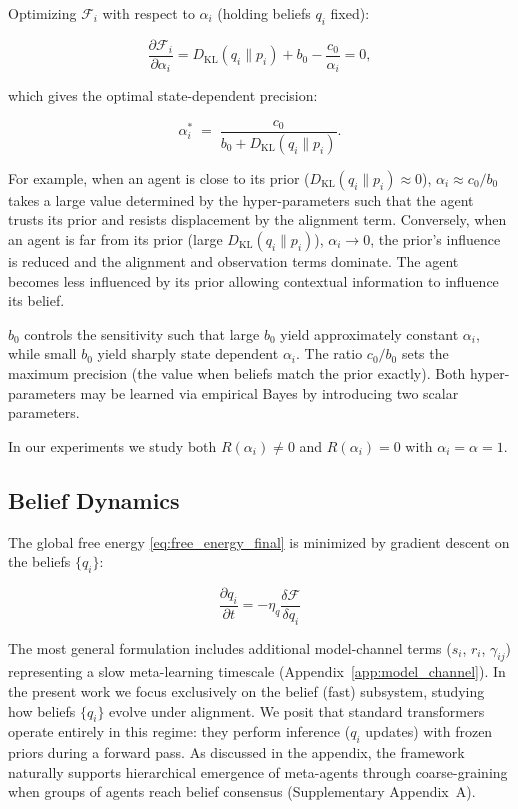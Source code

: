 \documentclass[twoside,11pt]{article}
\begin{document}
Optimizing $\mathcal{F}_i$ with respect to $\alpha_i$ (holding beliefs $q_i$ fixed):

\begin{equation}
\frac{\partial \mathcal{F}_i}{\partial \alpha_i}
= D_{\mathrm{KL}}(q_i \| p_i) + b_0 - \frac{c_0}{\alpha_i} = 0,
\end{equation}

which gives the optimal state-dependent precision:

\begin{equation}
\boxed{
\alpha_i^*
\;=\; \frac{c_0}{b_0 + D_{\mathrm{KL}}(q_i \| p_i)}.
}
\label{eq:state_dependent_alpha}
\end{equation}

For example, when an agent is close to its prior ($D_{\mathrm{KL}}(q_i \| p_i) \approx 0$), $\alpha_i \approx c_0/b_0$ takes a large value determined by the hyper-parameters such that the agent trusts its prior and resists displacement by the alignment term. Conversely, when an agent is far from its prior (large $D_{\mathrm{KL}}(q_i \| p_i)$), $\alpha_i \to 0$,  the prior's influence is reduced and the alignment and observation terms dominate. The agent becomes less influenced by its prior allowing contextual information to influence its belief.

$b_0$ controls the sensitivity such that large $b_0$ yield approximately constant $\alpha_i$, while small $b_0$ yield sharply state dependent $\alpha_i$. The ratio $c_0/b_0$ sets the maximum precision (the value when beliefs match the prior exactly). Both hyper-parameters may be learned via empirical Bayes by introducing two scalar parameters.

In our experiments we study both $R(\alpha_i) \neq 0$ and $R(\alpha_i) = 0$ with $\alpha_i = \alpha = 1$.


\subsection{Belief Dynamics}

The global free energy \eqref{eq:free_energy_final} is minimized by gradient descent on the beliefs $\{q_i\}$:

\begin{equation}
\frac{\partial q_i}{\partial t} = -\eta_q \frac{\delta \mathcal{F}}{\delta q_i}
\label{eq:belief_dynamics}
\end{equation}

The most general formulation includes additional model-channel terms ($s_i$, $r_i$, $\gamma_{ij}$) representing a slow meta-learning timescale (Appendix~\ref{app:model_channel}). In the present work we focus exclusively on the belief (fast) subsystem, studying how beliefs $\{q_i\}$ evolve under alignment. We posit that standard transformers operate entirely in this regime: they perform inference ($q_i$ updates) with frozen priors during a forward pass. As discussed in the appendix, the framework naturally supports hierarchical emergence of meta-agents through coarse-graining when groups of agents reach belief consensus (Supplementary Appendix~A).
\end{document}
